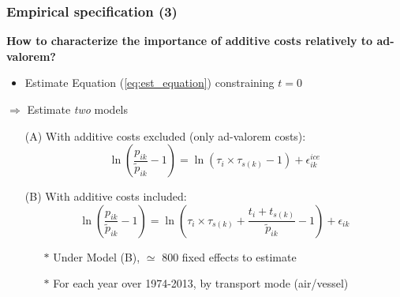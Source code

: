 \documentclass[10 pt,Helvetica, french]{beamer}
\begin{document}
\begin{frame}
\frametitle{Empirical specification (3)}
\textbf{How to characterize the importance of additive costs relatively to ad-valorem?} \vspace{0.1cm}
\begin{itemize}
\item Estimate Equation (\ref{eq:est_equation}) constraining $t=0$ \vspace{0.1cm}
\end{itemize}
$\Rightarrow$ Estimate \textit{two} models\vspace{0.1cm}
\begin{itemize}
\item[(A)] With additive costs excluded (only ad-valorem costs):
\footnotesize
\begin{equation}
\ln\left(\frac{p_{ik}}{\widetilde{p}_{ik}}-1 \right)= \ln \left(\tau_{i} \times \tau_{s(k)}-1 \right) + \epsilon^{ice}_{ik} \label{eq:model_nlI}
\end{equation}
\normalsize
\item[(B)] With additive costs included:
\footnotesize
\begin{equation}
\ln\left(\frac{p_{ik}}{\widetilde{p}_{ik}}-1 \right)= \ln \left(\tau_{i} \times \tau_{s(k)}+\frac{t_{i} + t_{s(k)}}{\widetilde{p}_{ik}}-1 \right) + \epsilon_{ik} \label{eq:est_equation}
\end{equation}
\normalsize
\begin{itemize}
\item[$\ast$] Under Model (B), $\simeq$ 800 fixed effects to estimate  \vspace{0.1cm}
\item[$\ast$] For each year over 1974-2013, by transport mode (air/vessel)
\end{itemize}
\end{itemize}
\end{frame}
\end{document}
